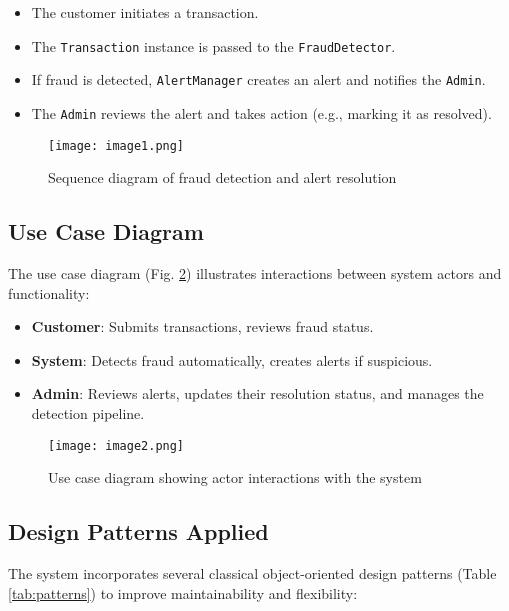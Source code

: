 \documentclass[12pt]{article}
\begin{document}
\begin{itemize}
    \item The customer initiates a transaction.
    \item The \texttt{Transaction} instance is passed to the \texttt{FraudDetector}.
    \item If fraud is detected, \texttt{AlertManager} creates an alert and notifies the \texttt{Admin}.
    \item The \texttt{Admin} reviews the alert and takes action (e.g., marking it as resolved).
\end{itemize}

\begin{figure}[H]
\centering
\texttt{[image: image1.png]}
\caption{Sequence diagram of fraud detection and alert resolution}
\label{fig:sequence_diagram}
\end{figure}

\subsection{Use Case Diagram}
The use case diagram (Fig. \ref{fig:use_case}) illustrates interactions between system actors and functionality:

\begin{itemize}
    \item \textbf{Customer}: Submits transactions, reviews fraud status.
    \item \textbf{System}: Detects fraud automatically, creates alerts if suspicious.
    \item \textbf{Admin}: Reviews alerts, updates their resolution status, and manages the detection pipeline.
\end{itemize}

\begin{figure}[h!]
\centering
\texttt{[image: image2.png]}
\caption{Use case diagram showing actor interactions with the system}
\label{fig:use_case}
\end{figure}

\subsection{Design Patterns Applied}
The system incorporates several classical object-oriented design patterns (Table \ref{tab:patterns}) to improve maintainability and flexibility:
\end{document}
